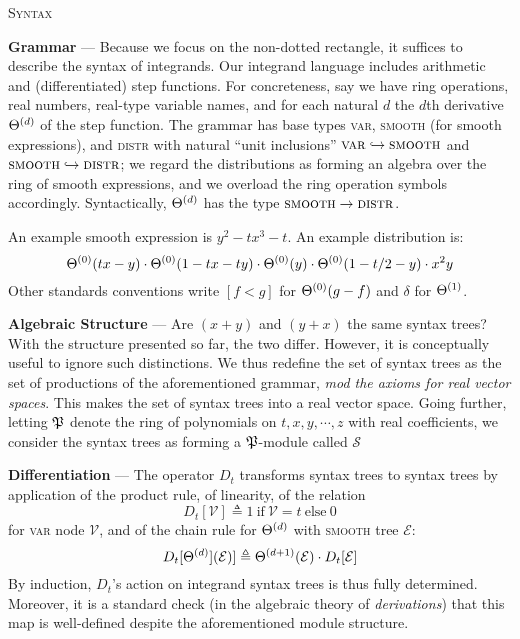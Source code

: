 \begin{center}\large\textsc{Syntax}\end{center}
    
    \noindent\textbf{Grammar} ---
    Because we focus on the non-dotted rectangle, it suffices to describe the
    syntax of integrands.
    Our integrand language includes arithmetic and (differentiated) step
    functions.  For concreteness, say we have ring operations, real numbers,
    real-type variable names, and for each natural $d$ the $d$th derivative
    $\Theta^{(d)}$ of the step function.
    The grammar has base types \textsc{var},
    \textsc{smooth} (for smooth expressions), and \textsc{distr} with
    natural ``unit inclusions'' $\text{\textsc{var}}\hookrightarrow
    \text{\textsc{smooth}}$ and $\text{\textsc{smooth}}\hookrightarrow
    \text{\textsc{distr}}$; we regard the distributions as forming
    an algebra over the ring of smooth expressions, and we overload the
    ring operation symbols accordingly.  Syntactically, $\Theta^{(d)}$ has the type
    $\text{\textsc{smooth}}\to \text{\textsc{distr}}$.

    An example smooth expression is $y^2 - t x^3 - t$.  An example distribution
    is:
    $$
        \Theta^{(0)}(tx-y)\cdot\Theta^{(0)}(1-tx-ty)\cdot\Theta^{(0)}(y)\cdot\Theta^{(0)}(1-t/2-y)
        \cdot x^2 y
    $$
    Other standards conventions write $[f<g]$ for $\Theta^{(0)}(g-f)$ and $\delta$
    for $\Theta^{(1)}$.

    \textbf{Algebraic Structure} ---
    Are $(x+y)$ and $(y+x)$ the same syntax trees?  With the structure
    presented so far, the two differ.  However, it is conceptually useful to
    ignore such distinctions.  We thus redefine the set of syntax trees as the
    set of productions of the aforementioned grammar, \emph{mod the axioms for
    real vector spaces}.  This makes the set of syntax trees into a real vector
    space.  Going further, letting $\frak P$ denote the ring of polynomials on
    $t,x,y,\cdots, z$ with real coefficients, we consider the syntax trees
    as forming a $\frak P$-module called $\mathcal S$ 

    \textbf{Differentiation} ---
    The operator $D_t$ transforms syntax trees to
    syntax trees by application of the product rule, of linearity,
    of the relation 
    $$
        D_t[{\mathcal V}] \triangleq 1~\text{if}~{\mathcal V}=t~\text{else}~0
    $$
    for \textsc{var} node $\mathcal V$,
    and of the chain rule for $\Theta^{(d)}$ with \textsc{smooth} tree $\mathcal E$:
    $$
        D_t[\Theta^{(d)}]({\mathcal E})] \triangleq \Theta^{(d+1)}({\mathcal E}) \cdot D_t[{\mathcal E}]  
    $$
    By induction, $D_t$'s action on integrand syntax trees is thus fully
    determined.  Moreover, it is a standard check (in the algebraic theory of
    \emph{derivations}) that this map is well-defined despite the 
    aforementioned module structure. 

